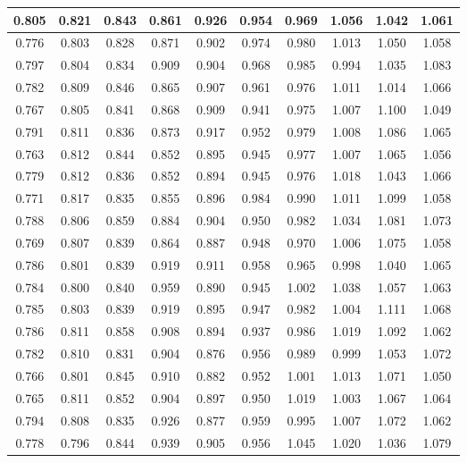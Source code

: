 \begin{table}[!ht]
\begin{tabular}{|c|c|c|c|c|c|c|c|c|c|}
      0.805 & 0.821 & 0.843 & 0.861 & 0.926 & 0.954 & 0.969 & 1.056 & 1.042 & 1.061 \\ \hline
      0.776 & 0.803 & 0.828 & 0.871 & 0.902 & 0.974 & 0.980 & 1.013 & 1.050 & 1.058 \\ \hline
      0.797 & 0.804 & 0.834 & 0.909 & 0.904 & 0.968 & 0.985 & 0.994 & 1.035 & 1.083 \\ \hline
      0.782 & 0.809 & 0.846 & 0.865 & 0.907 & 0.961 & 0.976 & 1.011 & 1.014 & 1.066 \\ \hline
      0.767 & 0.805 & 0.841 & 0.868 & 0.909 & 0.941 & 0.975 & 1.007 & 1.100 & 1.049 \\ \hline
      0.791 & 0.811 & 0.836 & 0.873 & 0.917 & 0.952 & 0.979 & 1.008 & 1.086 & 1.065 \\ \hline
      0.763 & 0.812 & 0.844 & 0.852 & 0.895 & 0.945 & 0.977 & 1.007 & 1.065 & 1.056 \\ \hline
      0.779 & 0.812 & 0.836 & 0.852 & 0.894 & 0.945 & 0.976 & 1.018 & 1.043 & 1.066 \\ \hline
      0.771 & 0.817 & 0.835 & 0.855 & 0.896 & 0.984 & 0.990 & 1.011 & 1.099 & 1.058 \\ \hline
      0.788 & 0.806 & 0.859 & 0.884 & 0.904 & 0.950 & 0.982 & 1.034 & 1.081 & 1.073 \\ \hline
      0.769 & 0.807 & 0.839 & 0.864 & 0.887 & 0.948 & 0.970 & 1.006 & 1.075 & 1.058 \\ \hline
      0.786 & 0.801 & 0.839 & 0.919 & 0.911 & 0.958 & 0.965 & 0.998 & 1.040 & 1.065 \\ \hline
      0.784 & 0.800 & 0.840 & 0.959 & 0.890 & 0.945 & 1.002 & 1.038 & 1.057 & 1.063 \\ \hline
      0.785 & 0.803 & 0.839 & 0.919 & 0.895 & 0.947 & 0.982 & 1.004 & 1.111 & 1.068 \\ \hline
      0.786 & 0.811 & 0.858 & 0.908 & 0.894 & 0.937 & 0.986 & 1.019 & 1.092 & 1.062 \\ \hline
      0.782 & 0.810 & 0.831 & 0.904 & 0.876 & 0.956 & 0.989 & 0.999 & 1.053 & 1.072 \\ \hline
      0.766 & 0.801 & 0.845 & 0.910 & 0.882 & 0.952 & 1.001 & 1.013 & 1.071 & 1.050 \\ \hline
      0.765 & 0.811 & 0.852 & 0.904 & 0.897 & 0.950 & 1.019 & 1.003 & 1.067 & 1.064 \\ \hline
      0.794 & 0.808 & 0.835 & 0.926 & 0.877 & 0.959 & 0.995 & 1.007 & 1.072 & 1.062 \\ \hline
      0.778 & 0.796 & 0.844 & 0.939 & 0.905 & 0.956 & 1.045 & 1.020 & 1.036 & 1.079 \\ \hline

\end{tabular}
\end{table}
